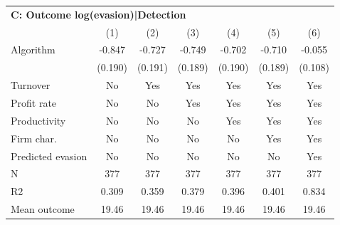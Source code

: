 \begin{tabular}{lcccccc}
\midrule \multicolumn{7}{l}{\textbf{C: Outcome log(evasion)|Detection}} \\ \multicolumn{1}{l}{} & (1) & (2) & (3) & (4) & (5) & (6) \\ \midrule
Algorithm   &      -0.847\sym{***}&      -0.727\sym{***}&      -0.749\sym{***}&      -0.702\sym{***}&      -0.710\sym{***}&      -0.055         \\
            &     (0.190)         &     (0.191)         &     (0.189)         &     (0.190)         &     (0.189)         &     (0.108)         \\
\midrule
Turnover    &          No         &         Yes         &         Yes         &         Yes         &         Yes         &         Yes         \\
Profit rate &          No         &          No         &         Yes         &         Yes         &         Yes         &         Yes         \\
Productivity&          No         &          No         &          No         &         Yes         &         Yes         &         Yes         \\
Firm char.  &          No         &          No         &          No         &          No         &         Yes         &         Yes         \\
Predicted evasion&          No         &          No         &          No         &          No         &          No         &         Yes         \\
N           &         377         &         377         &         377         &         377         &         377         &         377         \\
R2          &       0.309         &       0.359         &       0.379         &       0.396         &       0.401         &       0.834         \\
Mean outcome&       19.46         &       19.46         &       19.46         &       19.46         &       19.46         &       19.46         \\
\bottomrule \end{tabular}
